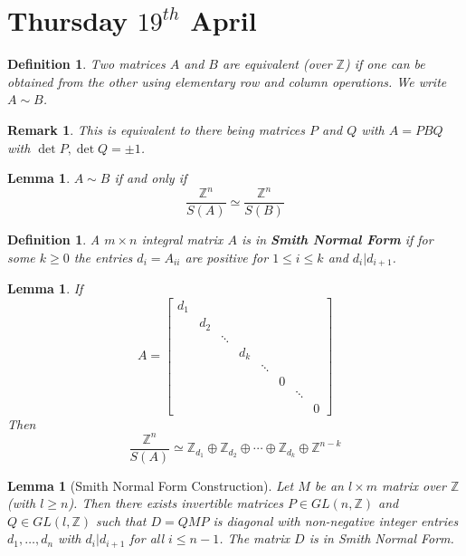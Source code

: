 \documentclass[a4paper,10pt]{article}
\newcommand{\ZZ}{\mathbb{Z}}
\newtheorem{Def}[thm]{Definition}
\newtheorem{Lem}[thm]{Lemma}
\newtheorem{rem}[thm]{Remark}
\begin{document}
\section{Thursday $19^{th}$ April}

\begin{Def}
Two matrices $A$ and $B$ are equivalent (over $\ZZ$) if one can be obtained from the other using elementary row and column operations.  We write $A \sim B$. 
\end{Def}

\begin{rem}
This is equivalent to there being matrices $P$ and $Q$ with $A = PBQ$ with $\det P, \det Q = \pm 1$. 
\end{rem}

\begin{Lem}
$A \sim B$ if and only if 
\[ \frac{\ZZ^n}{S(A)} \simeq \frac{\ZZ^n}{S(B)} \]
\end{Lem}

\begin{Def}
A $m\times n$ integral matrix $A$ is in \textbf{Smith Normal Form} if for some $k \geq 0$ the entries $d_i = A_{ii}$ are positive for $1 \leq i \leq k$ and $d_i | d_{i+1}$. 
\end{Def}

\begin{Lem}
If 
\[A = \begin{bmatrix} d_1 \\
                        & d_2 \\
                        & &\ddots \\
                        & &       & d_k \\
                        & & &          & \ddots \\
                        & & & &             & 0 \\
                        & & & & &                & \ddots \\
                        & & & & & &                   & 0
 \end{bmatrix} \]
Then 
\[ \frac{\ZZ^n}{S(A)} \simeq \ZZ_{d_1} \oplus \ZZ_{d_2} \oplus \cdots \oplus \ZZ_{d_k} \oplus \ZZ^{n - k} \]
\end{Lem}

\begin{Lem}[Smith Normal Form Construction]
Let $M$ be an $l \times m$ matrix over $\ZZ$ (with $l \geq n$). Then there exists invertible matrices $P \in GL(n,\ZZ)$ and $Q \in GL(l,\ZZ)$ such that $D = QMP$ is diagonal with non-negative integer entries $d_1, \dots, d_n$ with $d_i | d_{i+1}$ for all $i \leq n-1$. The matrix $D$ is in Smith Normal Form.
\end{Lem}
\end{document}
